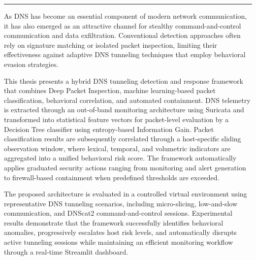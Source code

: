 \documentclass[14pt, a4paper, oneside]{report}
\begin{document}
\listoffigures
\egroup
\clearpage


{}
\thispagestyle{plain} %
\par\nobreak %
\vspace{0.1cm}%
{\color{chapcolor}\noindent\rule{\textwidth}{1pt}}\par\nobreak %
\vspace{1.0cm}%

As DNS has become an essential component of modern network communication, it has also emerged as an attractive channel for stealthy command-and-control communication and data exfiltration. Conventional detection approaches often rely on signature matching or isolated packet inspection, limiting their effectiveness against adaptive DNS tunneling techniques that employ behavioral evasion strategies.

This thesis presents a hybrid DNS tunneling detection and response framework that combines Deep Packet Inspection, machine learning-based packet classification, behavioral correlation, and automated containment. DNS telemetry is extracted through an out-of-band monitoring architecture using Suricata and transformed into statistical feature vectors for packet-level evaluation by a Decision Tree classifier using entropy-based Information Gain. Packet classification results are subsequently correlated through a host-specific sliding observation window, where lexical, temporal, and volumetric indicators are aggregated into a unified behavioral risk score. The framework automatically applies graduated security actions ranging from monitoring and alert generation to firewall-based containment when predefined thresholds are exceeded.

The proposed architecture is evaluated in a controlled virtual environment using representative DNS tunneling scenarios, including micro-slicing, low-and-slow communication, and DNScat2 command-and-control sessions. Experimental results demonstrate that the framework successfully identifies behavioral anomalies, progressively escalates host risk levels, and automatically disrupts active tunneling sessions while maintaining an efficient monitoring workflow through a real-time Streamlit dashboard.
\end{document}
